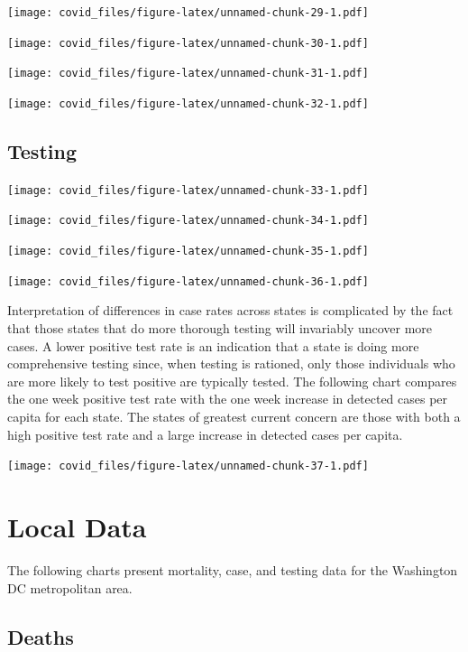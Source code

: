\documentclass[]{article}
\begin{document}
\texttt{[image: covid\_files/figure-latex/unnamed-chunk-29-1.pdf]}

\texttt{[image: covid\_files/figure-latex/unnamed-chunk-30-1.pdf]}
\newpage

\texttt{[image: covid\_files/figure-latex/unnamed-chunk-31-1.pdf]}

\texttt{[image: covid\_files/figure-latex/unnamed-chunk-32-1.pdf]}

\newpage

\hypertarget{testing-1}{%
\subsection{Testing}\label{testing-1}}

\texttt{[image: covid\_files/figure-latex/unnamed-chunk-33-1.pdf]}

\texttt{[image: covid\_files/figure-latex/unnamed-chunk-34-1.pdf]}

\newpage

\texttt{[image: covid\_files/figure-latex/unnamed-chunk-35-1.pdf]}

\texttt{[image: covid\_files/figure-latex/unnamed-chunk-36-1.pdf]}
\newpage

Interpretation of differences in case rates across states is complicated
by the fact that those states that do more thorough testing will
invariably uncover more cases. A lower positive test rate is an
indication that a state is doing more comprehensive testing since, when
testing is rationed, only those individuals who are more likely to test
positive are typically tested. The following chart compares the one week
positive test rate with the one week increase in detected cases per
capita for each state. The states of greatest current concern are those
with both a high positive test rate and a large increase in detected
cases per capita.

\texttt{[image: covid\_files/figure-latex/unnamed-chunk-37-1.pdf]}

\newpage

\hypertarget{local-data}{%
\section{Local Data}\label{local-data}}

The following charts present mortality, case, and testing data for the
Washington DC metropolitan area.

\hypertarget{deaths-2}{%
\subsection{Deaths}\label{deaths-2}}
\end{document}
